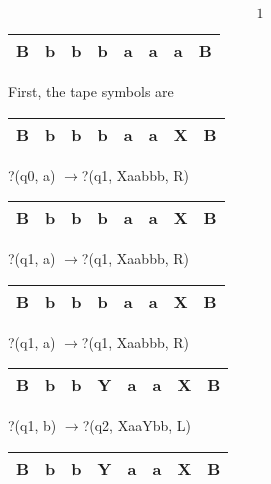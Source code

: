 \documentclass{article} %
\begin{document}


\noindent 

\noindent 

\noindent 

\noindent 
\[1\] 


\begin{tabular}{|p{0.2in}|p{0.2in}|p{0.2in}|p{0.2in}|p{0.2in}|p{0.2in}|p{0.2in}|p{0.2in}|} \hline 
B & b & b & b & a & a & a & B \\ \hline 
\end{tabular}

First, the tape symbols are

 

\begin{tabular}{|p{0.2in}|p{0.2in}|p{0.2in}|p{0.2in}|p{0.2in}|p{0.2in}|p{0.2in}|p{0.2in}|} \hline 
B & b & b & b & a & a & X & B \\ \hline 
\end{tabular}

?(q0, a) $\to $?(q1, Xaabbb, R)

\noindent 

\begin{tabular}{|p{0.2in}|p{0.2in}|p{0.2in}|p{0.2in}|p{0.2in}|p{0.2in}|p{0.2in}|p{0.2in}|} \hline 
B & b & b & b & a & a & X & B \\ \hline 
\end{tabular}

?(q1, a) $\to $?(q1, Xaabbb, R)

\noindent 

\begin{tabular}{|p{0.2in}|p{0.2in}|p{0.2in}|p{0.2in}|p{0.2in}|p{0.2in}|p{0.2in}|p{0.2in}|} \hline 
B & b & b & b & a & a & X & B \\ \hline 
\end{tabular}

?(q1, a) $\to $?(q1, Xaabbb, R)

\noindent 

\begin{tabular}{|p{0.2in}|p{0.2in}|p{0.2in}|p{0.2in}|p{0.2in}|p{0.2in}|p{0.2in}|p{0.2in}|} \hline 
B & b & b & Y & a & a & X & B \\ \hline 
\end{tabular}

?(q1, b) $\to $?(q2, XaaYbb, L)

\noindent 

\begin{tabular}{|p{0.2in}|p{0.2in}|p{0.2in}|p{0.2in}|p{0.2in}|p{0.2in}|p{0.2in}|p{0.2in}|} \hline 
B & b & b & Y & a & a & X & B \\ \hline 
\end{tabular}
\end{document}
